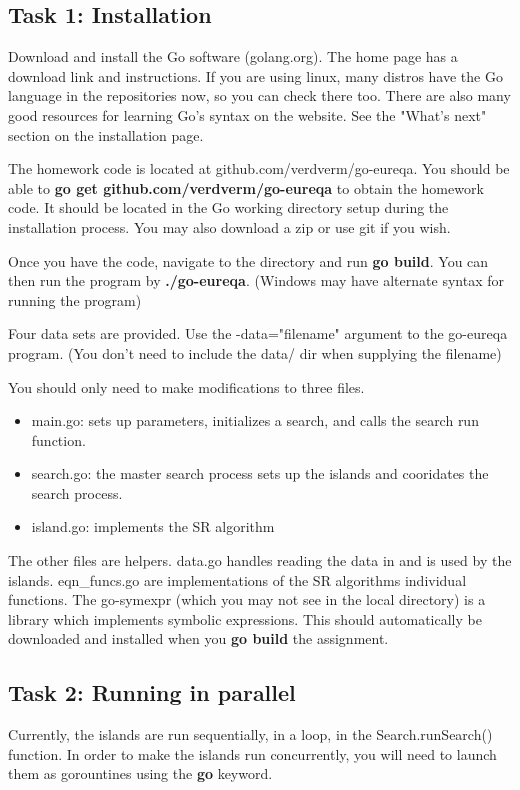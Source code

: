 \documentclass[a4paper,10pt]{article}
\begin{document}
\subsection*{Task 1: Installation}
Download and install the Go software (golang.org).
The home page has a download link and instructions.
If you are using linux, many distros have the Go language in the repositories now,
so you can check there too.
There are also many good resources for learning Go's syntax on the website.
See the "What's next" section on the installation page.

\noindent
The homework code is located at github.com/verdverm/go-eureqa.
You should be able to \textbf{go get github.com/verdverm/go-eureqa}
to obtain the homework code. It should be located in the Go
working directory setup during the installation process.
You may also download a zip or use git if you wish.

Once you have the code, navigate to the directory and run
\textbf{go build}. You can then run the program by
\textbf{./go-eureqa}. (Windows may have alternate syntax for running the program)

Four data sets are provided. Use the -data="filename" argument
to the go-eureqa program. 
(You don't need to include the data/ dir when supplying the filename)

You should only need to make modifications to three files.
\begin{itemize}
\item main.go: sets up parameters, initializes a search, and calls the search run function.
\item search.go: the master search process sets up the islands and cooridates the search process.
\item island.go: implements the SR algorithm
\end{itemize}

The other files are helpers. data.go handles reading the data in and is used by the islands.
eqn\_funcs.go are implementations of the SR algorithms individual functions.
The go-symexpr (which you may not see in the local directory) is a library
which implements symbolic expressions. This should automatically be
downloaded and installed when you \textbf{go build} the assignment.

\subsection*{Task 2: Running in parallel}
Currently, the islands are run sequentially, in a loop,
in the Search.runSearch() function.
In order to make the islands run concurrently,
you will need to launch them as gorountines
using the \textbf{go} keyword.
\end{document}
